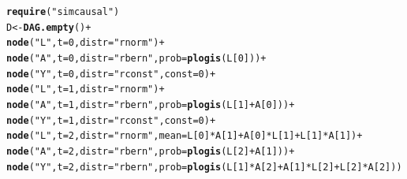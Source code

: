 \documentclass{article}\usepackage[]{graphicx}\usepackage[]{color}
\makeatletter
\newcommand{\hlnum}[1]{\textcolor[rgb]{0.686,0.059,0.569}{#1}}%
\newcommand{\hlstr}[1]{\textcolor[rgb]{0.192,0.494,0.8}{#1}}%
\newcommand{\hlopt}[1]{\textcolor[rgb]{0,0,0}{#1}}%
\newcommand{\hlstd}[1]{\textcolor[rgb]{0.345,0.345,0.345}{#1}}%
\newcommand{\hlkwb}[1]{\textcolor[rgb]{0.69,0.353,0.396}{#1}}%
\newcommand{\hlkwc}[1]{\textcolor[rgb]{0.333,0.667,0.333}{#1}}%
\newcommand{\hlkwd}[1]{\textcolor[rgb]{0.737,0.353,0.396}{\textbf{#1}}}%
\newenvironment{kframe}{%
 \def\at@end@of@kframe{}%
 \ifinner\ifhmode%
  \def\at@end@of@kframe{\end{minipage}}%
  \begin{minipage}{\columnwidth}%
 \fi\fi%
 \def\FrameCommand##1{\hskip\@totalleftmargin \hskip-\fboxsep
 \colorbox{shadecolor}{##1}\hskip-\fboxsep
     \hskip-\linewidth \hskip-\@totalleftmargin \hskip\columnwidth}%
 \MakeFramed {\advance\hsize-\width
   \@totalleftmargin\z@ \linewidth\hsize
   \@setminipage}}%
 {\par\unskip\endMakeFramed%
 \at@end@of@kframe}
\newenvironment{knitrout}{}{} %
\makeatother
\begin{document}
\begin{knitrout}
\color{fgcolor}\begin{kframe}
\begin{alltt}
\hlkwd{require}\hlstd{(}\hlstr{"simcausal"}\hlstd{)}
\hlstd{D} \hlkwb{<-} \hlkwd{DAG.empty}\hlstd{()} \hlopt{+}
    \hlkwd{node}\hlstd{(}\hlstr{"L"}\hlstd{,} \hlkwc{t} \hlstd{=} \hlnum{0}\hlstd{,} \hlkwc{distr} \hlstd{=} \hlstr{"rnorm"}\hlstd{)} \hlopt{+}
    \hlkwd{node}\hlstd{(}\hlstr{"A"}\hlstd{,} \hlkwc{t} \hlstd{=} \hlnum{0}\hlstd{,} \hlkwc{distr} \hlstd{=} \hlstr{"rbern"}\hlstd{,} \hlkwc{prob} \hlstd{=} \hlkwd{plogis}\hlstd{(L[}\hlnum{0}\hlstd{]))} \hlopt{+}
    \hlkwd{node}\hlstd{(}\hlstr{"Y"}\hlstd{,} \hlkwc{t} \hlstd{=} \hlnum{0}\hlstd{,} \hlkwc{distr} \hlstd{=} \hlstr{"rconst"}\hlstd{,} \hlkwc{const} \hlstd{=} \hlnum{0}\hlstd{)} \hlopt{+}
    \hlkwd{node}\hlstd{(}\hlstr{"L"}\hlstd{,} \hlkwc{t} \hlstd{=} \hlnum{1}\hlstd{,} \hlkwc{distr} \hlstd{=} \hlstr{"rnorm"}\hlstd{)} \hlopt{+}
    \hlkwd{node}\hlstd{(}\hlstr{"A"}\hlstd{,} \hlkwc{t} \hlstd{=} \hlnum{1}\hlstd{,} \hlkwc{distr} \hlstd{=} \hlstr{"rbern"}\hlstd{,} \hlkwc{prob} \hlstd{=} \hlkwd{plogis}\hlstd{(L[}\hlnum{1}\hlstd{]} \hlopt{+} \hlstd{A[}\hlnum{0}\hlstd{]))} \hlopt{+}
    \hlkwd{node}\hlstd{(}\hlstr{"Y"}\hlstd{,} \hlkwc{t} \hlstd{=} \hlnum{1}\hlstd{,} \hlkwc{distr} \hlstd{=} \hlstr{"rconst"}\hlstd{,} \hlkwc{const} \hlstd{=} \hlnum{0}\hlstd{)} \hlopt{+}
    \hlkwd{node}\hlstd{(}\hlstr{"L"}\hlstd{,} \hlkwc{t} \hlstd{=} \hlnum{2}\hlstd{,} \hlkwc{distr} \hlstd{=} \hlstr{"rnorm"}\hlstd{,} \hlkwc{mean} \hlstd{= L[}\hlnum{0}\hlstd{]}\hlopt{*}\hlstd{A[}\hlnum{1}\hlstd{]} \hlopt{+} \hlstd{A[}\hlnum{0}\hlstd{]}\hlopt{*}\hlstd{L[}\hlnum{1}\hlstd{]} \hlopt{+} \hlstd{L[}\hlnum{1}\hlstd{]}\hlopt{*}\hlstd{A[}\hlnum{1}\hlstd{])} \hlopt{+}
    \hlkwd{node}\hlstd{(}\hlstr{"A"}\hlstd{,} \hlkwc{t} \hlstd{=} \hlnum{2}\hlstd{,} \hlkwc{distr} \hlstd{=} \hlstr{"rbern"}\hlstd{,} \hlkwc{prob} \hlstd{=} \hlkwd{plogis}\hlstd{(L[}\hlnum{2}\hlstd{]} \hlopt{+} \hlstd{A[}\hlnum{1}\hlstd{]))} \hlopt{+}
    \hlkwd{node}\hlstd{(}\hlstr{"Y"}\hlstd{,} \hlkwc{t} \hlstd{=} \hlnum{2}\hlstd{,} \hlkwc{distr} \hlstd{=} \hlstr{"rbern"}\hlstd{,} \hlkwc{prob} \hlstd{=} \hlkwd{plogis}\hlstd{(L[}\hlnum{1}\hlstd{]}\hlopt{*}\hlstd{A[}\hlnum{2}\hlstd{]} \hlopt{+} \hlstd{A[}\hlnum{1}\hlstd{]}\hlopt{*}\hlstd{L[}\hlnum{2}\hlstd{]} \hlopt{+} \hlstd{L[}\hlnum{2}\hlstd{]}\hlopt{*}\hlstd{A[}\hlnum{2}\hlstd{]))}
\end{alltt}
\end{kframe}
\end{knitrout}
\end{document}
